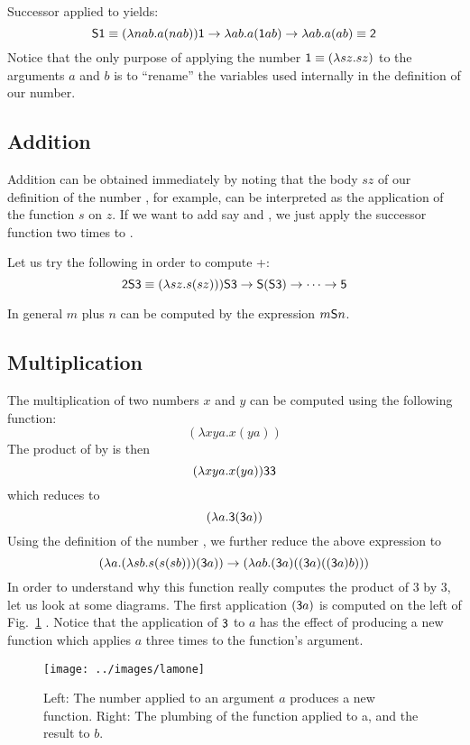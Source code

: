 Successor applied to {} yields:
$${\sf S}{\sf 1}\equiv (\lambda nab.a(nab)){\sf 1} \rightarrow \lambda ab.a ({\sf 1}ab) \rightarrow \lambda ab.a(ab)\equiv {\sf 2}$$
Notice that the only purpose of applying the number ${\sf 1}\equiv(\lambda sz.sz)$ to the arguments $a$ and $b$ is to ``rename'' the variables used internally in the definition of our number.

\subsection{Addition}
Addition can be obtained immediately by noting that the body $sz$ of our definition of the number {}, for example, can be interpreted as the application of the function $s$ on $z$. If we want to add say {} and {}, we just apply the successor function two times to {}. 

Let us try the following in order to compute {}+{}:
$${\sf 2}{\sf S}{\sf 3}\equiv (\lambda sz.s(sz))){\sf S}{\sf 3}\rightarrow {\sf S}({\sf S}{\sf 3})\rightarrow \cdots \rightarrow {\sf 5}$$

In general $m$ plus $n$ can be computed by the expression $m{\sf S}n$.


\subsection{Multiplication}
The multiplication of two numbers $x$ and $y$ can be computed using the following function:
$$(\lambda xya.x(ya))$$ The product of {} by {} is then
$$(\lambda xya.x(ya)){\sf 3}{\sf 3}$$ which reduces to $$(\lambda a.{\sf 3}({\sf 3}a))$$
Using the definition of the number {}, we further reduce the above expression to
$$
(\lambda a.(\lambda sb.s(s(sb)))({\sf 3}a)) \rightarrow (\lambda ab. ({\sf 3}a)(({\sf 3}a)(({\sf 3}a)b)))
$$
In order to understand why this function really computes the product of 3 by 3, let us look at some diagrams. The first application 
$({\sf 3}a)$ is computed on the left of  Fig.~\ref{mult1} . Notice that the application of ${\sf 3}$ to $a$ has the effect of producing a new
function which applies $a$ three times to the function's argument.


\begin{figure}[htb]
\centerline{\texttt{[image: ../images/lamone]}}
\caption{Left: The number {} applied to an argument $a$ produces a new function. Right: The plumbing of the function {} applied to {}a, 
and the result to $b$.\label{mult1}}
\end{figure} 


